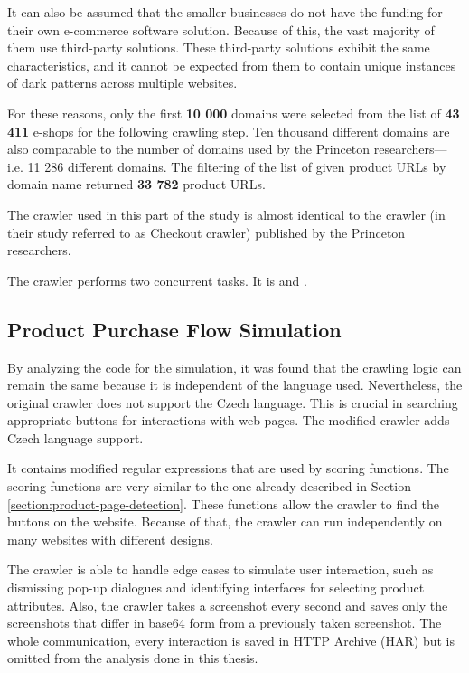         It can also be assumed that the smaller businesses do not have the funding for their own e-commerce software solution. Because of this, the vast majority of them use third-party solutions. These third-party solutions exhibit the same characteristics, and it cannot be expected from them to contain unique instances of dark patterns across multiple websites. 
        
        For these reasons, only the first \textbf{10 000} domains were selected from the list of \textbf{43 411} e-shops for the following crawling step. Ten thousand different domains are also comparable to the number of domains used by the Princeton researchers---i.e. 11 286 different domains. The filtering of the list of given product URLs by domain name returned \textbf{33 782} product URLs.
        
        The crawler used in this part of the study is almost identical to the crawler (in their study referred to as Checkout crawler) published by the Princeton researchers.

        The crawler performs two concurrent tasks. It is  and .

        \subsection{Product Purchase Flow Simulation}
        \label{section:flow-simulation}
            By analyzing the code for the simulation, it was found that the crawling logic can remain the same because it is independent of the language used. Nevertheless, the original crawler does not support the Czech language. This is crucial in searching appropriate buttons for interactions with web pages. The modified crawler adds Czech language support.

            It contains modified regular expressions that are used by scoring functions. The scoring functions are very similar to the one already described in Section \ref{section:product-page-detection}. These functions allow the crawler to find the buttons on the website. Because of that, the crawler can run independently on many websites with different designs. 

            The crawler is able to handle edge cases to simulate user interaction, such as dismissing pop-up dialogues and identifying interfaces for selecting product attributes. Also, the crawler takes a screenshot every second and saves only the screenshots that differ in base64 form \cite{base64} from a previously taken screenshot. The whole communication, every interaction is saved in HTTP Archive (HAR) but is omitted from the analysis done in this thesis.
            
